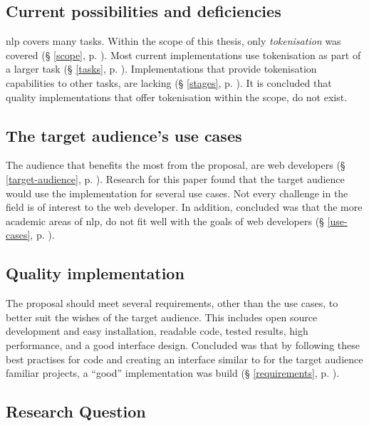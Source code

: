 \subsection{Current possibilities and
  deficiencies}\label{q-current-possibilities-and-deficientcies}

\gls{nlp} covers many tasks.
Within the scope of this thesis, only \emph{tokenisation} was covered
  (§ \ref{scope}, p. \pageref{scope}).
Most current implementations use tokenisation as part of a larger task
  (§ \ref{tasks}, p. \pageref{tasks}).
Implementations that provide tokenisation capabilities to other tasks,
  are lacking (§ \ref{stages}, p. \pageref{stages}).
It is concluded that quality implementations that offer tokenisation within
  the scope, do not exist.

\subsection{The target audience's use cases}\label{q-use-cases}

The audience that benefits the most from the proposal, are web developers
  (§ \ref{target-audience}, p. \pageref{target-audience}).
Research for this paper found that the target audience would use the
  implementation for several use cases.
Not every challenge in the field is of interest to the web developer.
In addition, concluded was that the more academic areas of \gls{nlp}, do not
  fit well with the goals of web developers (§ \ref{use-cases},
  p. \pageref{use-cases}).

\subsection{Quality implementation}\label{q-quality-implementation}

The proposal should meet several requirements, other than the use cases,
  to better suit the wishes of the target audience.
This includes open source development and easy installation, readable code,
  tested results, high performance, and a good interface design.
Concluded was that by following these best practises for code and creating
  an interface similar to for the target audience familiar projects, a
  ``good'' implementation was build (§ \ref{requirements},
  p. \pageref{requirements}).

\subsection{Research Question}\label{q-research-question}

